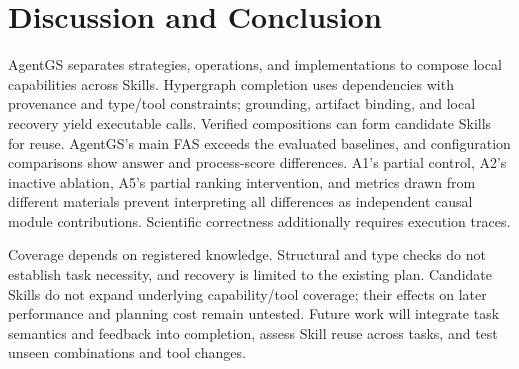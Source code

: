 \section{Discussion and Conclusion}
\label{sec:conclusion}
AgentGS separates strategies, operations, and implementations to compose local capabilities across Skills. Hypergraph completion uses dependencies with provenance and type/tool constraints; grounding, artifact binding, and local recovery yield executable calls. Verified compositions can form candidate Skills for reuse. AgentGS's main FAS exceeds the evaluated baselines, and configuration comparisons show answer and process-score differences. A1's partial control, A2's inactive ablation, A5's partial ranking intervention, and metrics drawn from different materials prevent interpreting all differences as independent causal module contributions. Scientific correctness additionally requires execution traces.

Coverage depends on registered knowledge. Structural and type checks do not establish task necessity, and recovery is limited to the existing plan. Candidate Skills do not expand underlying capability/tool coverage; their effects on later performance and planning cost remain untested. Future work will integrate task semantics and feedback into completion, assess Skill reuse across tasks, and test unseen combinations and tool changes.
